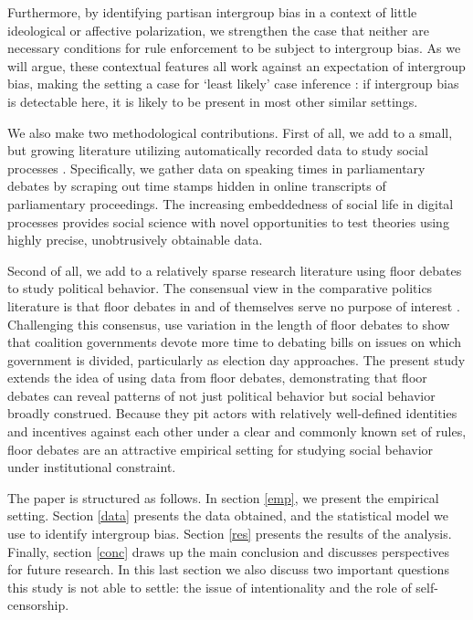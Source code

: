 \documentclass[12pt,a4paper]{article}
\begin{document}
Furthermore, by identifying partisan intergroup bias in a context of little ideological or affective polarization, we strengthen the case that neither are necessary conditions for rule enforcement to be subject to intergroup bias. As we will argue, these contextual features all work against an expectation of intergroup bias, making the setting a case for `least likely' case inference \citep{Levy2008}: if intergroup bias is detectable here, it is likely to be present in most other similar settings.

We also make two methodological contributions. First of all, we add to a small, but growing literature utilizing automatically recorded data to study social processes \citep{King2011}. Specifically, we gather data on speaking times in parliamentary debates by scraping out time stamps hidden in online transcripts of parliamentary proceedings. The increasing embeddedness of social life in digital processes provides social science with novel opportunities to test theories using highly precise, unobtrusively obtainable data.

Second of all, we add to a relatively sparse research literature using floor debates to study political behavior. The consensual view in the comparative politics literature is that floor debates in and of themselves serve no purpose of interest \citep{Gallagher2005}. Challenging this consensus, \cite{Martin2008} use variation in the length of floor debates to show that coalition governments devote more time to debating bills on issues on which government is divided, particularly as election day approaches. The present study extends the idea of using data from floor debates, demonstrating that floor debates can reveal patterns of not just political behavior but social behavior broadly construed. Because they pit actors with relatively well-defined identities and incentives against each other under a clear and commonly known set of rules, floor debates are an attractive empirical setting for studying social behavior under institutional constraint. %

The paper is structured as follows. In section \ref{emp}, we present the empirical setting. Section \ref{data} presents the data obtained, and the statistical model we use to identify intergroup bias. Section \ref{res} presents the results of the analysis. Finally, section \ref{conc} draws up the main conclusion and discusses perspectives for future research. In this last section we also discuss two important questions this study is not able to settle: the issue of intentionality and the role of self-censorship.
\end{document}
